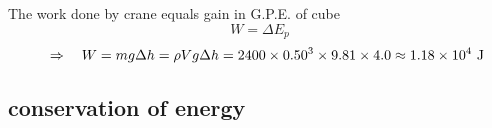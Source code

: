 
\begin{soln}
    
The work done by crane equals gain in G.P.E. of cube
\begin{equation*}
W = \Delta E_p 
\end{equation*}
\begin{equation*}
\quad \Rightarrow \quad W = mg\Delta h = \rho V g \Delta h = 2400 \times 0.50^3 \times 9.81 \times 4.0 \approx 1.18\times10^4 \text{ J} 
\end{equation*}
\end{soln}

\subsection{conservation of energy}\label{ch:conservation-of-energy}









